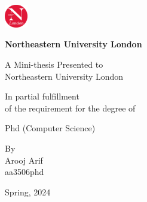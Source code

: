 \begin{minipage}{0.1\textwidth}
  \includegraphics[width=1cm]{nu_logo.jpeg}
\end{minipage}
\begin{minipage}{0.7\textwidth}\raggedleft
\textbf{\Large Northeastern University London}
\end{minipage}
\vfill
\vfill
\begin{center}

\LARGE {}

\end{center}

\vfill
\begin{center}\large
A Mini-thesis Presented to\\
\vfill
\Large Northeastern University London
\end{center}

\vfill
\begin{center}\normalsize
In partial fulfillment\\
of the requirement for the degree of
\end{center}

\begin{center}\LARGE
Phd (Computer Science)
\end{center}

\vfill
\begin{center}


\normalsize By\\

\large Arooj Arif\\
\large aa3506phd\\
\end{center}
\vfill


\begin{center}
\Large Spring, 2024
\end{center}
